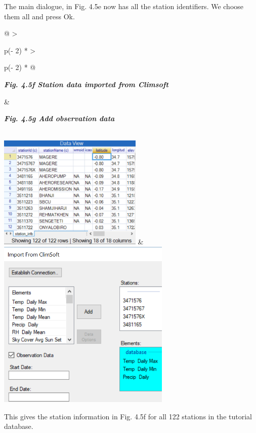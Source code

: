 \documentclass[
  letterpaper,
  DIV=11,
  numbers=noendperiod]{scrreprt}
\begin{document}
The main dialogue, in Fig. 4.5e now has all the station identifiers. We
choose them all and press Ok.

\begin{longtable}[]{@{}
  >{\raggedright\arraybackslash}p{(\columnwidth - 2\tabcolsep) * }
  >{\raggedright\arraybackslash}p{(\columnwidth - 2\tabcolsep) * }@{}}
\toprule\noalign{}
\begin{minipage}[b]{\linewidth}\raggedright
\textbf{\emph{Fig. 4.5f Station data imported from Climsoft}}
\end{minipage} & \begin{minipage}[b]{\linewidth}\raggedright
\textbf{\emph{Fig. 4.5g Add observation data}}
\end{minipage} \\
\midrule\noalign{}
\endhead
\bottomrule\noalign{}
\endlastfoot
\includegraphics[width=2.70723in,height=2.13959in]{figures/Fig4.5f.png}
&
\includegraphics[width=3.24578in,height=3.18499in]{figures/Fig4.5g.png} \\
\end{longtable}

This gives the station information in Fig. 4.5f for all 122 stations in
the tutorial database.
\end{document}
